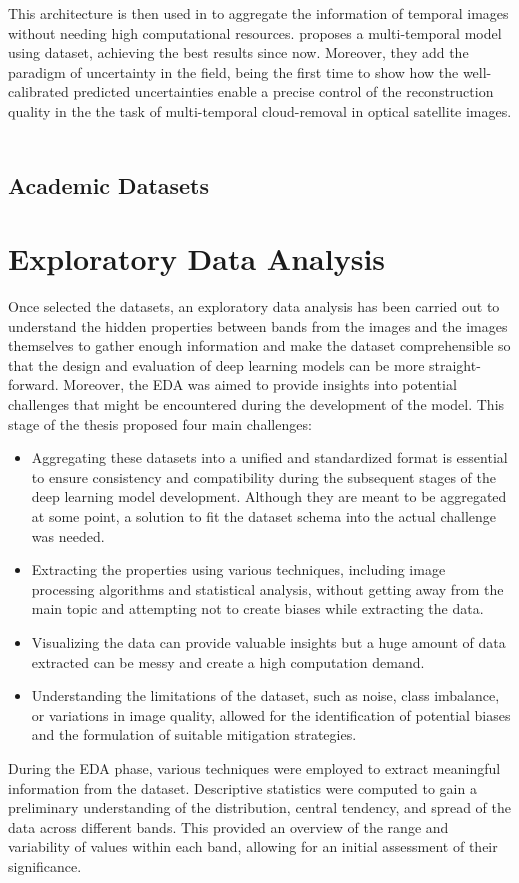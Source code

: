 \documentclass[11pt, a4paper]{article}
\begin{document}
	This architecture is then used in \cite{uncrtaints2021ebel} to aggregate the information of temporal images without needing high computational resources. \cite{uncrtaints2021ebel} proposes a multi-temporal model using \cite{sen12mscrts} dataset, achieving the best results since now. Moreover, they add the paradigm of uncertainty in the field, being the first time to show how the well-calibrated predicted uncertainties
	enable a precise control of the reconstruction quality in the the task of multi-temporal
	cloud-removal in optical satellite images.
	\\
	\\
	
	
	\subsection{Academic Datasets}
	
	
	
	\section{Exploratory Data Analysis}
	Once selected the datasets, an exploratory data analysis has been carried out to understand the hidden properties between bands from the images and the images themselves to gather enough information and make the dataset comprehensible so that the design and evaluation of deep learning models can be more straight-forward. Moreover, the EDA was aimed to provide insights into potential challenges that might be encountered during the development of the model. This stage of the thesis proposed four main challenges:
	\begin{itemize}
		\item Aggregating these datasets into a unified and standardized format is essential to ensure consistency and compatibility during the subsequent stages of the deep learning model development. Although they are meant to be aggregated at some point, a solution to fit the dataset schema into the actual challenge was needed.
		\item Extracting the properties using various techniques, including image processing algorithms and statistical analysis, without getting away from the main topic and attempting not to create biases while extracting the data.
		\item Visualizing the data can provide valuable insights but a huge amount of data extracted can be messy and create a high computation demand. 
		\item Understanding the limitations of the dataset, such as noise, class imbalance, or variations in image quality, allowed for the identification of potential biases and the formulation of suitable mitigation strategies.
	\end{itemize}
	During the EDA phase, various techniques were employed to extract meaningful information from the dataset. Descriptive statistics were computed to gain a preliminary understanding of the distribution, central tendency, and spread of the data across different bands. This provided an overview of the range and variability of values within each band, allowing for an initial assessment of their significance.
\end{document}
